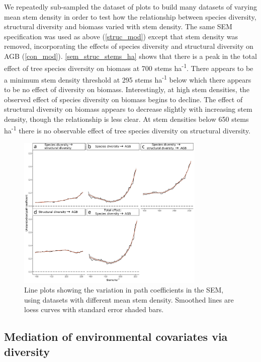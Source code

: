 \documentclass[11pt,a4paper]{article}
\begin{document}
We repeatedly sub-sampled the dataset of plots to build many datasets of varying mean stem density in order to test how the relationship between species diversity, structural diversity and biomass varied with stem density. The same SEM specification was used as above (\autoref{struc_mod}) except that stem density was removed, incorporating the effects of species diversity and structural diversity on AGB (\autoref{con_mod}).  \autoref{sem_struc_stems_ha} shows that there is a peak in the total effect of tree species diversity on biomass at \textapprox{}700 stems ha\textsuperscript{-1}. There appears to be a minimum stem density threshold at \textapprox{}295 stems ha\textsuperscript{-1} below which there appears to be no effect of diversity on biomass. Interestingly, at high stem densities, the observed effect of species diversity on biomass begins to decline. The effect of structural diversity on biomass appears to decrease slightly with increasing stem density, though the relationship is less clear. At stem densities below \textapprox{}650 stems ha\textsuperscript{-1}  there is no observable effect of tree species diversity on structural diversity.

\begin{figure}[H]
\centering
	\includegraphics[width=0.8\textwidth]{sem_struc_stems_ha}
	\caption{Line plots showing the variation in path coefficients in the SEM, using datasets with different mean stem density. Smoothed lines are loess curves with standard error shaded bars.}
	\label{sem_struc_stems_ha}
\end{figure}

\subsection{Mediation of environmental covariates via diversity}
\end{document}
